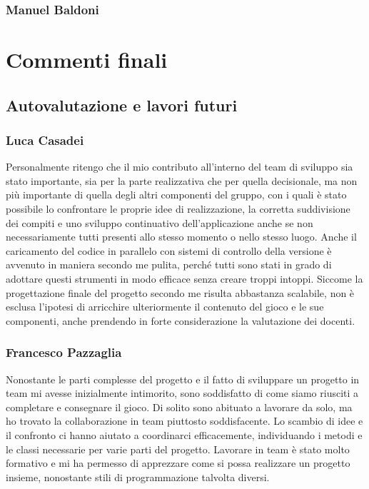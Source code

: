 \documentclass[a4paper,12pt]{report}
\begin{document}
\subsection*{Manuel Baldoni}

\chapter{Commenti finali}

\section{Autovalutazione e lavori futuri}

\subsection*{Luca Casadei}
Personalmente ritengo che il mio contributo all'interno del team di sviluppo sia stato importante, sia per la parte realizzativa che per quella decisionale, ma non più importante di quella degli altri componenti del gruppo, con i quali è stato possibile lo confrontare le proprie idee di realizzazione, la corretta suddivisione dei compiti e uno sviluppo continuativo dell'applicazione anche se non necessariamente tutti presenti allo stesso momento o nello stesso luogo. Anche il caricamento del codice in parallelo con sistemi di controllo della versione è avvenuto in maniera secondo me pulita, perché tutti sono stati in grado di adottare questi strumenti in modo efficace senza creare troppi intoppi. Siccome la progettazione finale del progetto secondo me risulta abbastanza scalabile, non è esclusa l'ipotesi di arricchire ulteriormente il contenuto del gioco e le sue componenti, anche prendendo in forte considerazione la valutazione dei docenti.

\subsection*{Francesco Pazzaglia}

Nonostante le parti complesse del progetto e il fatto di sviluppare un progetto in team mi avesse inizialmente intimorito, sono soddisfatto di come siamo riusciti a completare e consegnare il gioco. Di solito sono abituato a lavorare da solo, ma ho trovato la collaborazione in team piuttosto soddisfacente. Lo scambio di idee e il confronto ci hanno aiutato a coordinarci efficacemente, individuando i metodi e le classi necessarie per varie parti del progetto. Lavorare in team è stato molto formativo e mi ha permesso di apprezzare come si possa realizzare un progetto insieme, nonostante stili di programmazione talvolta diversi.
\end{document}
